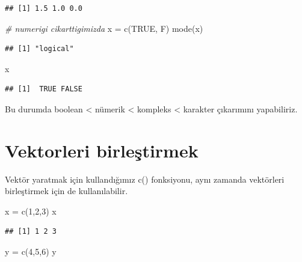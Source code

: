 \documentclass[
]{book}
\newenvironment{Shaded}{\begin{snugshade}}{\end{snugshade}}
\newcommand{\CommentTok}[1]{\textcolor[rgb]{0.56,0.35,0.01}{\textit{#1}}}
\newcommand{\ConstantTok}[1]{\textcolor[rgb]{0.00,0.00,0.00}{#1}}
\newcommand{\DecValTok}[1]{\textcolor[rgb]{0.00,0.00,0.81}{#1}}
\newcommand{\FunctionTok}[1]{\textcolor[rgb]{0.00,0.00,0.00}{#1}}
\newcommand{\NormalTok}[1]{#1}
\newcommand{\OtherTok}[1]{\textcolor[rgb]{0.56,0.35,0.01}{#1}}
\begin{document}
\begin{verbatim}
## [1] 1.5 1.0 0.0
\end{verbatim}

\begin{Shaded}
\begin{Highlighting}[]
\CommentTok{\# numerigi cikarttigimizda}
\NormalTok{x }\OtherTok{=} \FunctionTok{c}\NormalTok{(}\ConstantTok{TRUE}\NormalTok{, F)}
\FunctionTok{mode}\NormalTok{(x)}
\end{Highlighting}
\end{Shaded}

\begin{verbatim}
## [1] "logical"
\end{verbatim}

\begin{Shaded}
\begin{Highlighting}[]
\NormalTok{x}
\end{Highlighting}
\end{Shaded}

\begin{verbatim}
## [1]  TRUE FALSE
\end{verbatim}

Bu durumda boolean \textless{} nümerik \textless{} kompleks \textless{} karakter çıkarımını yapabiliriz.

\hypertarget{vektorleri-birleux15ftirmek}{%
\section{Vektorleri birleştirmek}\label{vektorleri-birleux15ftirmek}}

Vektör yaratmak için kullandığımız c() fonksiyonu, aynı zamanda vektörleri birleştirmek için de kullanılabilir.

\begin{Shaded}
\begin{Highlighting}[]
\NormalTok{x }\OtherTok{=} \FunctionTok{c}\NormalTok{(}\DecValTok{1}\NormalTok{,}\DecValTok{2}\NormalTok{,}\DecValTok{3}\NormalTok{)}
\NormalTok{x}
\end{Highlighting}
\end{Shaded}

\begin{verbatim}
## [1] 1 2 3
\end{verbatim}

\begin{Shaded}
\begin{Highlighting}[]
\NormalTok{y }\OtherTok{=} \FunctionTok{c}\NormalTok{(}\DecValTok{4}\NormalTok{,}\DecValTok{5}\NormalTok{,}\DecValTok{6}\NormalTok{)}
\NormalTok{y}
\end{Highlighting}
\end{Shaded}
\end{document}
